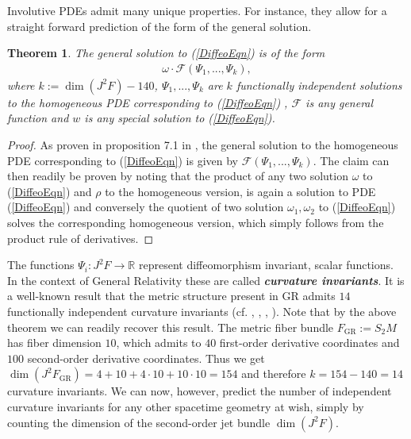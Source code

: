 \documentclass[%
preprint,
nofootinbib,
amsmath,amssymb,
aps,
prd,
floatfix,
]{revtex4-2}
\newtheorem{theorem}{Theorem}
\begin{document}
Involutive PDEs admit many unique properties. For instance, they allow for a straight forward prediction of the form of the general solution.
\begin{theorem}\label{FormalSol}
The general solution to (\ref{DiffeoEqn}) is of the form
\begin{align}
    \omega \cdot \mathcal{F} \left (\Psi_1,...,\Psi_k \right ),
\end{align}
where $k:= \operatorname{dim}(J^2F) - 140$,  $\Psi_1,...,\Psi_k$ are $k$ functionally independent solutions to the homogeneous PDE corresponding to (\ref{DiffeoEqn}) , $\mathcal{F}$ is any general function and $w$ is any special solution to (\ref{DiffeoEqn}).
\end{theorem}
\begin{proof}
As proven in proposition 7.1 in \cite{seiler1994analysis}, the general solution to the homogeneous PDE corresponding to (\ref{DiffeoEqn}) is given by $\mathcal{F} \left (\Psi_1,...,\Psi_k \right )$. The claim can then readily be proven by noting that the product of any two solution $\omega$ to (\ref{DiffeoEqn}) and $\rho$ to the homogeneous version, is again a solution to PDE (\ref{DiffeoEqn}) and conversely the quotient of two solution $\omega_1,\omega_2$ to (\ref{DiffeoEqn}) solves the corresponding homogeneous version, which simply follows from the product rule of derivatives. \end{proof}

The functions $\Psi_i: J^2F \rightarrow \mathbb{R}$ represent diffeomorphism invariant, scalar functions. In the context of General Relativity these are called \textit{\textbf{curvature invariants}}. It is a well-known result that the metric structure present in GR admits $14$ functionally independent curvature invariants (cf. \cite{2009CQGra..26b5013C}, \cite{Zakhary1997}, \cite{2002IJMPD..11..827C}, \cite{doi:10.1063/1.531425}). 
Note that by the above theorem we can readily recover this result. The metric fiber bundle $F_{\text{GR}}:=S_2M$ has fiber dimension $10$, which admits to $40$ first-order derivative coordinates and $100$ second-order derivative coordinates. Thus we get $\operatorname{dim}(J^2F_{\text{GR}}) = 4+10+4\cdot10+10\cdot10 = 154$ and therefore $k=154-140=14$ curvature invariants. 
We can now, however, predict the number of independent curvature invariants for any other spacetime geometry at wish, simply by counting the dimension of the second-order jet bundle $\operatorname{dim}(J^2F)$.
\end{document}
